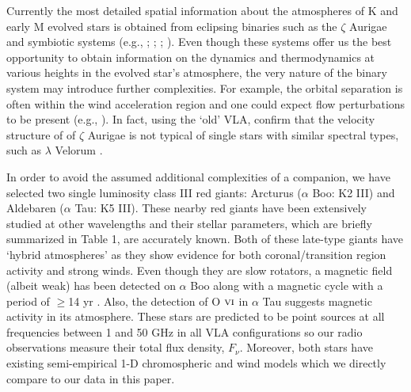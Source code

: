 \documentclass[iop]{emulateapj}
\begin{document}
Currently the most detailed spatial information about the atmospheres of K and early M evolved stars is obtained from eclipsing binaries such as the $\zeta$ Aurigae and symbiotic systems (e.g., \citealt{1970VA.....12..147W}; \citealt{1996ApJ...466..979B}; \citealt{2008AJ....136.1964E}; \citealt{2008ApJ...675..711C}). Even though these systems offer us the best opportunity to obtain information on the dynamics and thermodynamics at various heights in the evolved star's atmosphere, the very nature of the binary system may introduce further complexities. For example, the orbital separation is often within the wind acceleration region and one could expect flow perturbations to be present (e.g., \citealt{1981ApJ...248.1043C}). In fact, using the `old' VLA, \cite{2005AJ....129.1018H} confirm that the velocity structure of  of $\zeta$ Aurigae is not typical of single stars with similar spectral types, such as $\lambda$ Velorum \citep{1999ApJ...521..382C}. 

In order to avoid the assumed additional complexities of a companion, we have selected two single luminosity class III red giants: Arcturus ($\alpha$ Boo: K2 III) and Aldebaren ($\alpha$ Tau: K5 III). These nearby red giants have been extensively studied at other wavelengths and their stellar parameters, which are briefly summarized in Table 1, are accurately known. Both of these late-type giants have `hybrid atmospheres' as they show evidence for both coronal/transition region activity and strong winds. Even though they are slow rotators, a magnetic field (albeit weak) has been detected on $\alpha$ Boo \citep{2011A&A...529A.100S} along with a magnetic cycle with a period of $\geq$14 yr \citep{2008ApJ...679.1531B}. Also, the detection of O $\textsc{vi}$ in $\alpha$ Tau \citep{2005ApJ...622..629D} suggests magnetic activity in its atmosphere. These stars are predicted to be point sources at all frequencies between 1 and 50 GHz in all VLA configurations so our radio observations measure their total flux density, $F_{\nu}$. Moreover, both stars have existing semi-empirical 1-D chromospheric and wind models which we directly compare to our data in this paper.
\end{document}
